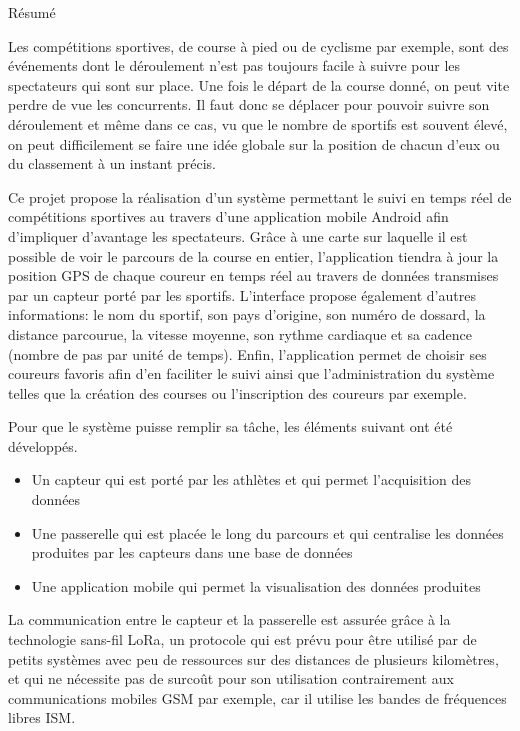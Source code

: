 \LARGE{Résumé}

\begin{normalsize}


Les compétitions sportives, de course à pied ou de cyclisme par exemple, sont des événements dont le déroulement n'est pas toujours facile à suivre pour les spectateurs qui sont sur place. Une fois le départ de la course donné, on peut vite perdre de vue les concurrents. Il faut donc se déplacer pour pouvoir suivre son déroulement et même dans ce cas, vu que le nombre de sportifs est souvent élevé, on peut difficilement se faire une idée globale sur la position de chacun d'eux ou du classement à un instant précis.

Ce projet propose la réalisation d’un système permettant le suivi en temps réel de compétitions sportives au travers d’une application mobile Android afin d'impliquer d'avantage les spectateurs. Grâce à une carte sur laquelle il est possible de voir le parcours de la course en entier, l'application tiendra à jour la position GPS de chaque coureur en temps réel au travers de données transmises par un capteur porté par les sportifs. L'interface propose également d'autres informations: le nom du sportif, son pays d'origine, son numéro de dossard, la distance parcourue, la vitesse moyenne, son rythme cardiaque et sa cadence (nombre de pas par unité de temps). Enfin, l'application permet de choisir ses coureurs favoris afin d'en faciliter le suivi ainsi que l'administration du système telles que la création des courses ou l'inscription des coureurs par exemple.

Pour que le système puisse remplir sa tâche, les éléments suivant ont été développés.

\begin{itemize}
\item Un capteur qui est porté par les athlètes et qui permet l'acquisition des données
\item Une passerelle qui est placée le long du parcours et qui centralise les données produites par les capteurs dans une base de données
\item Une application mobile qui permet la visualisation des données produites
\end{itemize}

La communication entre le capteur et la passerelle est assurée grâce à la technologie sans-fil LoRa, un protocole qui est prévu pour être utilisé par de petits systèmes avec peu de ressources sur des distances de plusieurs kilomètres, et qui ne nécessite pas de surcoût pour son utilisation contrairement aux communications mobiles GSM par exemple, car il utilise les bandes de fréquences libres ISM.


\end{normalsize}
